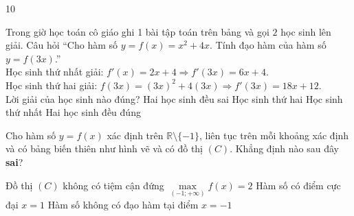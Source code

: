 \begin{indapan}{10}
\begin{ex}%
	Trong giờ học toán cô giáo ghi 1 bài tập toán trên bảng và gọi $2$ học sinh lên giải. Câu hỏi ``Cho hàm số $y=f(x)=x^2+4x$. Tính đạo hàm của hàm số $y=f(3x)$.''\\
	Học sinh thứ nhất giải: $f'(x)=2x+4\Rightarrow f'(3x) = 6x+4$.\\
	Học sinh thứ hai giải: $f(3x)=(3x)^2+4(3x) \Rightarrow f'(3x) = 18x+12$.\\
	Lời giải của học sinh nào đúng?
	\choice
	{Hai học sinh đều sai}
	{\True Học sinh thứ hai}
	{Học sinh thứ nhất}
	{Hai học sinh đều đúng}
\end{ex}

\begin{ex}%
	Cho hàm số $y=f(x)$ xác định trên $\mathbb{R}\setminus\{-1\}$, liên tục trên mỗi khoảng xác định và có bảng biến thiên như hình vẽ và có đồ thị $(C)$. Khẳng định nào sau đây \textbf{sai}?
	\begin{center}
	\end{center}
	\choice
	{\True Đồ thị $(C)$ không có tiệm cận đứng}
	{$\max\limits_{(-1;+\infty)}f(x)=2$}
	{Hàm số có điểm cực đại $x=1$}
	{Hàm số không có đạo hàm tại điểm $x=-1$}
\end{ex}


\end{indapan}
